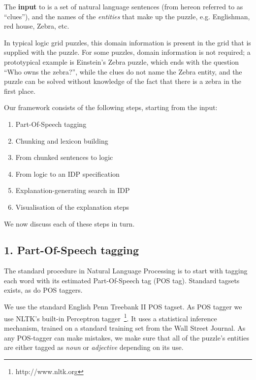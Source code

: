 
The \textbf{input} to \ourtool is a set of natural language sentences (from hereon referred to as ``clues''), and the names of the \textit{entities} that make up the puzzle, e.g. Englishman, red house, Zebra, etc.

In typical logic grid puzzles, this domain information is present in the grid that is supplied with the puzzle. For some puzzles, domain information is not required; a prototypical example is Einstein's Zebra puzzle, which ends with the question ``Who owns the zebra?'', while the clues do not name the Zebra entity, and the puzzle can be solved without knowledge of the fact that there is a zebra in the first place. 

%

Our framework consists of the following steps, starting from the input:
\begin{enumerate}
\item Part-Of-Speech tagging
\item Chunking and lexicon building
\item From chunked sentences to logic
\item From logic to an IDP specification
\item Explanation-generating search in IDP
\item Visualisation of the explanation steps
\end{enumerate}

We now discuss each of these steps in turn.

\subsection{1. Part-Of-Speech tagging}
The standard procedure in Natural Language Processing is to start with tagging each word with its estimated Part-Of-Speech tag (POS tag). Standard tagsets exists, as do POS taggers.

We use the standard English Penn Treebank II POS tagset. As POS tagger we use NLTK's built-in Perceptron tagger~\footnote{http://www.nltk.org}. It uses a statistical inference mechanism, trained on a standard training set from the Wall Street Journal. As any POS-tagger can make mistakes, we make sure that all of the puzzle's entities are either tagged as \textit{noun} or \textit{adjective} depending on its use.

